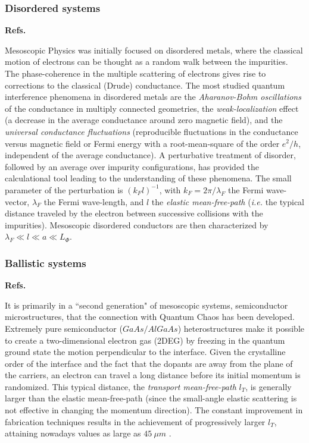 \documentclass[a4paper,10pt]{article}
\newcommand{\kf}{k_{\scriptscriptstyle F}}
\newcommand{\lf}{\lambda_{\scriptscriptstyle F}}
\newcommand{\lt}{l_{\scriptscriptstyle T}}
\newcommand{\nin}{\noindent}
\begin{document}
\subsubsection{Disordered systems}

{\bf Refs.~\cite{LeeRam,ChSm,ALWrev,WashWebb,AkkerMonta}}

\nin Mesoscopic Physics was initially focused on disordered
metals, where the classical motion of electrons can be thought as a 
random walk between the impurities. The phase-coherence
in the multiple scattering of electrons gives rise to 
corrections to the classical (Drude) conductance. The
most studied quantum interference phenomena in disordered
metals are the {\em Aharanov-Bohm oscillations} of the 
conductance in multiply connected geometries, the
{\em weak-localization} effect (a decrease in the 
average conductance around zero magnetic field), and the
{\em universal conductance fluctuations} (reproducible
fluctuations in the conductance versus magnetic field
or Fermi energy with a root-mean-square of the order
$e^2/h$, independent of the average conductance). 
A perturbative treatment of disorder, followed by an
average over impurity configurations, has provided 
the calculational tool leading to the understanding 
of these phenomena. The small parameter of the perturbation is 
$(\kf l)^{-1}$, with $\kf=2\pi/\lf$ the Fermi wave-vector, $\lf$ the Fermi wave-length, and $l$ the {\em elastic mean-free-path} ({\it i.e.}
the typical distance traveled by the electron between
successive collisions with the impurities). Mesoscopic 
disordered conductors are then characterized by
$\lf \ll l \ll a \ll L_{\Phi}$.

\subsubsection{Ballistic systems}

{\bf Refs.~\cite{BvHra,Davies98,Bird03}}

\nin It is primarily in a ``second generation" of mesoscopic systems,
semiconductor microstructures, that the connection with Quantum Chaos has been developed. Extremely pure semiconductor ($GaAs/AlGaAs$) heterostructures make it possible to create a two-dimensional electron gas (2DEG) by freezing in the quantum ground state the motion perpendicular to the interface. Given the crystalline order of the interface and the fact that the dopants are away from the plane of the carriers, an electron can travel a long distance before its initial momentum is randomized. This typical distance, the {\em transport mean-free-path} $\lt$, is generally larger than the elastic mean-free-path (since the small-angle elastic scattering is not effective in changing the momentum direction). The constant improvement in fabrication techniques results in the achievement of progressively larger $\lt$, attaining nowadays values as large as $45 \ \mu m$ \cite{trameanfreepath}. 
\end{document}
